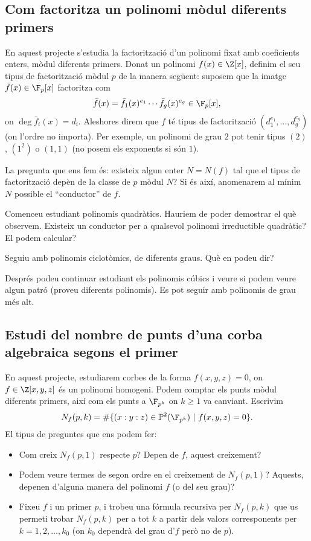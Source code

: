 \subsection{Com factoritza un polinomi mòdul diferents primers}
 
 En aquest projecte s'estudia la factorització d'un polinomi fixat amb coeficients enters, mòdul diferents primers. Donat un polinomi $f(x)\in\Z[x]$, definim el seu tipus de factorització mòdul $p$ de la manera següent: suposem que la imatge $\bar f(x)\in \F_p[x]$ factoritza com
 \[
 \bar f(x)= \bar f_1(x)^{e_1}\cdots \bar f_g(x)^{e_g}\in \F_p[x],
 \]
 on $\deg \bar f_i(x)= d_i$. Aleshores direm que $f$ té tipus de factorització $(d_1^{e_1},\ldots,d_g^{e_g})$ (on l'ordre no importa). Per exemple, un polinomi de grau $2$ pot tenir tipus $(2)$, $(1^2)$ o $(1,1)$ (no posem els exponents si són $1$).

 La pregunta que ens fem és: existeix algun enter $N=N(f)$ tal que el tipus de factorització depèn de la classe de $p$ mòdul $N$? Si és així, anomenarem al mínim $N$ possible el ``conductor'' de $f$.

 Comenceu estudiant polinomis quadràtics. Hauriem de poder demostrar el què observem. Existeix un conductor per a qualsevol polinomi irreductible quadràtic? El podem calcular?

 Seguiu amb polinomis ciclotòmics, de diferents graus. Què en podeu dir?

 Després podeu continuar estudiant els polinomis cúbics i veure si  podem veure algun patró (proveu diferents polinomis). Es pot seguir amb polinomis de grau més alt.

 \subsection{Estudi del nombre de punts d'una corba algebraica segons el primer}

 En aquest projecte, estudiarem corbes de la forma $f(x,y,z)=0$, on $f\in\Z[x,y,z]$ és un polinomi homogeni. Podem comptar els punts mòdul diferents primers, així com els punts a $\F_{p^k}$ on $k\geq 1$ va canviant. Escrivim
 \[
 N_f(p,k) = \# \{ (x:y:z)\in\mathbb{P}^2(\F_{p^k}) ~|~ f(x,y,z) = 0\}.
 \]
 El tipus de preguntes que ens podem fer:
 \begin{itemize}
     \item Com creix $N_f(p,1)$ respecte $p$? Depen de $f$, aquest creixement?
     \item Podem veure termes de segon ordre en el creixement de $N_f(p,1)$? Aquests, depenen d'alguna manera del polinomi $f$ (o del seu grau)?
     \item Fixeu $f$ i un primer $p$, i trobeu una fórmula recursiva per $N_f(p,k)$ que us permeti trobar $N_f(p,k)$ per a tot $k$ a partir dels valors corresponents per $k=1,2,\ldots, k_0$ (on $k_0$ dependrà del grau d'$f$ però no de $p$).
 \end{itemize}

